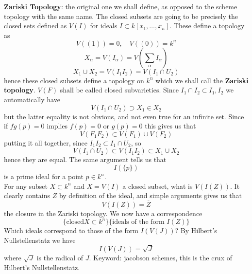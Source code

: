 \documentclass{article}
\theoremstyle{definition}
\theoremstyle{definition}
\theoremstyle{remark}
\newcommand{\un}{\cup}
\newcommand{\ic}{\cap}
\begin{document}
\textbf{Zariski Topology}: the original one we shall define, as opposed to the scheme topology with the same name.
The closed subsets are going to be precisely the closed sets defined as $V(I)$ for ideals $I \subset k[x_1, \dots, x_n]$.
These define a topology as 
\[V((1)) = 0, \quad V((0)) = k^n\]
\[X_{\alpha} = V(I_{\alpha}) = V( \sum_{\alpha} I_{\alpha})\]
\[X_1 \un X_2 = V(I_1 I_2) = V(I_1 \ic U_2)\]
hence these closed subsets define a topology on $k^n$ which we shall call the \textbf{Zariski topology}.
$V(F)$ shall be called closed subvarieties.
Since $I_1 \ic I_2 \subset I_1, I_2$ we automatically have
\[V(I_1 \ic U_2) \supset X_1 \in X_2\]
but the latter equality is not obvious, and not even true for an infinite set.
Since if $fg(p) = 0$ implies $f(p) = 0$ or $g(p) = 0$ this gives us that 
\[V(F_1 F_2) \subset V(F_1) \un V(F_2)\]
putting it all together, since $I_1I_2 \subset I_1 \ic U_2$, so
\[V(I_1 \ic U_2) \subset V(I_1 I_2) \subset X_1 \un X_2\]
hence they are equal.
The same argument tells us that 
\[I(\{p\})\]
 is a prime ideal for a point $p \in k^n$.\\
 For any subset $X \subset k^n$ and $X = V(I)$ a closed subset, what is $V(I(Z))$.
 It clearly contains $Z$ by definition of the ideal, and simple arguments gives us that 
 \[V(I(Z)) = \overline{Z}\]
 the closure in the Zariski topology.
 We now have a correspondence 
 \[\{\text{closed} X \subset k^n\} \{\text{ideals of the form } I(Z)\}\]
Which ideals correspond to those of the form $I(V(J))$? 
By Hilbert's Nullstellenstatz we have 
\[I(V(J)) = \sqrt{J}\]
where $\sqrt{J}$ is the radical of $J$. 
Keyword: jacobson schemes, this is the crux of Hilbert's Nullstellenstatz.
\end{document}
